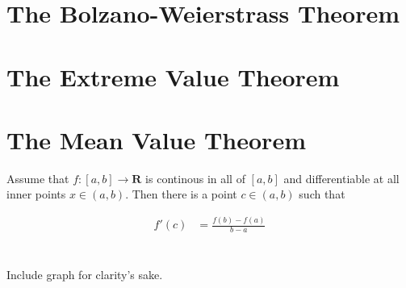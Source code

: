 \documentclass[12pt,letterpaper]{article}
\begin{document}
\section*{The Bolzano-Weierstrass Theorem}




\section*{The Extreme Value Theorem}




\section*{The Mean Value Theorem}
Assume that $f : [a,b] \to \mathbf{R}$ is continous in all of $[a,b]$ and differentiable at all inner points $x \in (a,b)$. Then there is a point $c \in (a,b)$ such that 

\begin{align*}
	f'(c) &= \frac{f(b)-f(a)}{b-a} \\
\end{align*}

\noindent \\
Include graph for clarity's sake.


\end{document}
